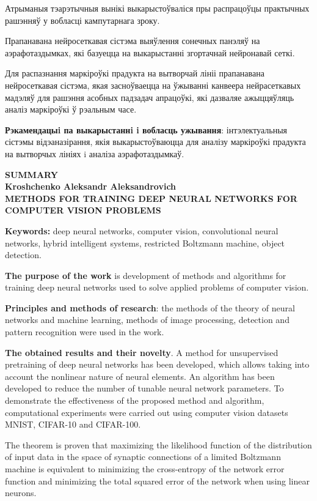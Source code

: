 \documentclass{thesisby}
\begin{document}
Атрыманыя тэарэтычныя вынікі выкарысто\u{у}валіся пры распрацо\u{у}цы практычных рашэння\u{у} у вобласці кампутарнага зроку.

Прапанавана нейросеткавая сістэма выяўлення сонечных панэля\u{у} на аэрафотаздымках, які базуецца на выкарыстанні згортачнай нейронавай сеткі.

Для распазнання маркіро\u{у}кі прадукта на вытворчай лініі прапанавана нейросеткавая сістэма, якая засно\u{у}ваецца на \u{у}жыванні канвеера нейрасеткавых мадэля\u{у} для рашэння асобных падзадач апрацо\u{у}кі, які дазваляе ажыцця\u{у}ляць аналіз маркіро\u{у}кі \u{у} рэальным часе.
	
\textbf{Рэкамендацыi па выкарыстаннi i вобласць ужывання}:
інтэлектуальныя сістэмы відэаназірання, якія выкарысто\u{у}ваюцца для аналізу маркіро\u{у}кі прадукта на вытворчых лініях i аналіза аэрафотаздымка\u{у}.

\newpage
\begin{center}
\bf SUMMARY\\[1mm]\rm Kroshchenko Aleksandr Aleksandrovich\\[1mm] \bf
METHODS FOR TRAINING DEEP NEURAL NETWORKS FOR COMPUTER VISION PROBLEMS
\end{center}

{\bf Keywords:} deep neural networks, computer vision, convolutional neural networks, hybrid intelligent systems, restricted Boltzmann machine, object detection.

\textbf{The purpose of the work } is development of methods and algorithms for training deep neural networks used to solve applied problems of computer vision.

\textbf{Principles and methods of research}: the methods of the theory of neural networks and machine learning, methods of image processing, detection and pattern recognition were used in the work.

\textbf{The obtained results and their novelty}.
A method for unsupervised pretraining of deep neural networks has been developed, which allows taking into account the nonlinear nature of neural elements. An algorithm has been developed to reduce the number of tunable neural network parameters. To demonstrate the effectiveness of the proposed method and algorithm, computational experiments were carried out using computer vision datasets MNIST, CIFAR-10 and CIFAR-100.

The theorem is proven that maximizing the likelihood function of the distribution of input data in the space of synaptic connections of a limited Boltzmann machine is equivalent to minimizing the cross-entropy of the network error function and minimizing the total squared error of the network when using linear neurons.
\end{document}
